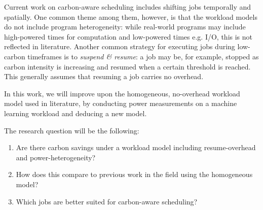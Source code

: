 Current work on carbon-aware scheduling includes shifting jobs temporally and spatially. 
One common theme among them, however, is that the workload models do not include program heterogeneity: while real-world programs may include high-powered times for computation and low-powered times e.g. I/O, this is not reflected in literature. 
Another common strategy for executing jobs during low-carbon timeframes is to \emph{suspend \& resume}: a job may be, for example, stopped as carbon intensity is increasing and resumed when a certain threshold is reached. 
This generally assumes that resuming a job carries no overhead. 

In this work, we will improve upon the homogeneous, no-overhead workload model used in literature, by conducting power measurements on a machine learning workload and deducing a new model.

The research question will be the following:

\begin{enumerate}
    \item Are there carbon savings under a workload model including resume-overhead and power-heterogeneity?
    \item How does this compare to previous work in the field using the homogeneous model?
    \item Which jobs are better suited for carbon-aware scheduling?
\end{enumerate}
